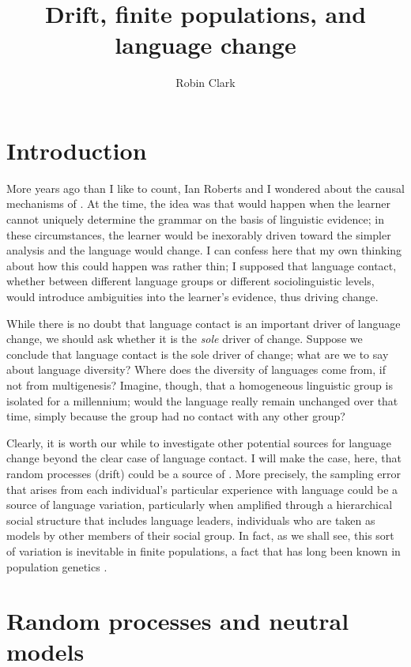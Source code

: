 \documentclass[output=paper]{langsci/langscibook}
\author{Robin Clark\affiliation{University of Pennsylvania}}
\title{Drift, finite populations, and language change}
\begin{document}
\glsresetall

\section{Introduction}

More years ago than I like to count, Ian Roberts and I wondered about the
causal mechanisms of  \citep{clark-roberts:1993}.  At the time,
the idea was that  would happen when the learner cannot uniquely
determine the grammar on the basis of linguistic evidence; in these
circumstances, the learner would be inexorably driven toward the simpler
analysis and the language would change.  I can confess here that my own
thinking about how this could happen was rather thin; I supposed that language
contact, whether between different language groups or different sociolinguistic
levels, would introduce ambiguities into the learner's evidence, thus driving
change.

While there is no doubt that language contact is an important driver of
language change, we should ask whether it is the \emph{sole} driver of change.
Suppose we conclude that language contact is the sole driver of change; what
are we to say about language diversity?  Where does the diversity of languages
come from, if not from multigenesis?  Imagine, though, that a homogeneous
linguistic group is isolated for a millennium; would the language really remain
unchanged over that time, simply because the group had no contact with any
other group?

Clearly, it is worth our while to investigate other potential sources for
language change beyond the clear case of language contact. I will make the
case, here, that random processes (drift) could be a source of .
More precisely, the sampling error that arises from each individual's
particular experience with language could be a source of language variation,
particularly when amplified through a hierarchical social structure that
includes language leaders, individuals who are taken as models by other members
of their social group.  In fact, as we shall see, this sort of variation is
inevitable in finite populations, a fact that has long been known in population
genetics \citep{crow-kimura:1970}.

\section{Random processes and neutral models}
\end{document}
